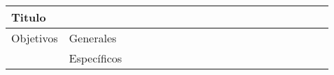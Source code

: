 \begin{table}[H]
\begin{turn}{90}
\begin{tabular}{@{}llllllllllllllllllll@{}}
\multicolumn{1}{l|}{Titulo}                                                            & \multicolumn{1}{l|}{}                                                                   & \multicolumn{1}{l|}{\cellcolor[HTML]{000000}} & \cellcolor[HTML]{000000}{\color[HTML]{000000} } &                          &                          &                                               &                          &                          &                          &                          & \multicolumn{1}{l|}{}                         &                          &                          &                          & \multicolumn{1}{l|}{}                         &                                               &                          &                          &                          \\ \midrule
\multicolumn{1}{l|}{Objetivos}                                                         & \multicolumn{1}{l|}{Generales}                                                          & \multicolumn{1}{l|}{}                         & \cellcolor[HTML]{000000}                        &                          &                          & \multicolumn{1}{l|}{}                         &                          &                          &                          &                          & \multicolumn{1}{l|}{}                         &                          &                          &                          & \multicolumn{1}{l|}{}                         &                                               &                          &                          &                          \\
\multicolumn{1}{l|}{}                                                                  & \multicolumn{1}{l|}{Específicos}                                                        & \multicolumn{1}{l|}{}                         & \cellcolor[HTML]{000000}                        & \cellcolor[HTML]{FFFFFF} &                          & \multicolumn{1}{l|}{}                         &                          &                          &                          &                          & \multicolumn{1}{l|}{}                         &                          &                          &                          & \multicolumn{1}{l|}{}                         &                                               &                          &                          &                          \\ \midrule

\end{tabular}
\end{turn}
\end{table}
